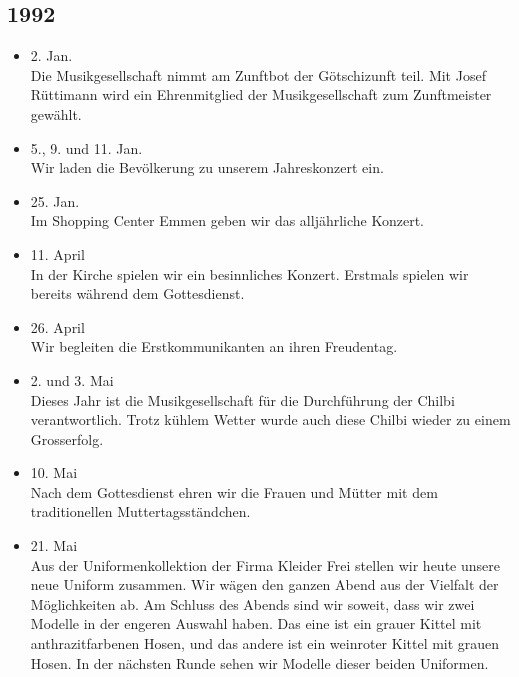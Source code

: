 \subsection*{1992}

\begin{history}


    \begin{itemize}

        \item 2. Jan.\\
              Die Musikgesellschaft nimmt am Zunftbot der Götschizunft teil. Mit Josef
              Rüttimann wird ein Ehrenmitglied der Musikgesellschaft zum Zunftmeister
              gewählt.

        \item 5., 9. und 11. Jan.\\
              Wir laden die Bevölkerung zu unserem Jahreskonzert ein.

        \item 25. Jan.\\
              Im Shopping Center Emmen geben wir das alljährliche Konzert.

        \item 11. April\\
              In der Kirche spielen wir ein besinnliches Konzert. Erstmals spielen wir
              bereits während dem Gottesdienst.

        \item 26. April\\
              Wir begleiten die Erstkommunikanten an ihren Freudentag.

        \item 2. und 3. Mai\\
              Dieses Jahr ist die Musikgesellschaft für die Durchführung der Chilbi
              verantwortlich. Trotz kühlem Wetter wurde auch diese Chilbi wieder zu
              einem Grosserfolg.

        \item 10. Mai\\
              Nach dem Gottesdienst ehren wir die Frauen und Mütter mit dem
              traditionellen Muttertagsständchen.

        \item 21. Mai\\
              Aus der Uniformenkollektion der Firma Kleider Frei stellen wir heute
              unsere neue Uniform zusammen. Wir wägen den ganzen Abend aus der
              Vielfalt der Möglichkeiten ab. Am Schluss des Abends sind wir soweit,
              dass wir zwei Modelle in der engeren Auswahl haben. Das eine ist ein
              grauer Kittel mit anthrazitfarbenen Hosen, und das andere ist ein
              weinroter Kittel mit grauen Hosen. In der nächsten Runde sehen wir
              Modelle dieser beiden Uniformen.


\end{itemize}
\end{history}
